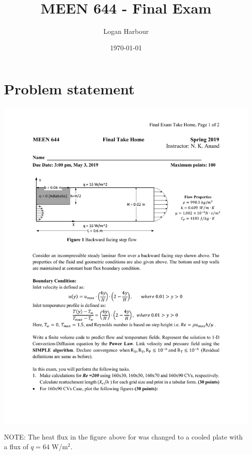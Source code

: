 \documentclass{article}
\newcommand{\pageTitle}{MEEN 644 - Final Exam}
\newcommand{\pageAuthor}{Logan Harbour}
\begin{document}
\title{\LARGE \textbf{\pageTitle} \vspace{-0.3cm}}
\author{\large \pageAuthor}
\date{\vspace{-0.6cm} \large \today \vspace{-0.4cm}}

\maketitle

\section{Problem statement}

\begin{center}
	\includegraphics[trim={2.8cm 16.8cm 2.5cm 6cm},clip,page=1,scale=0.8]{../doc/final.pdf}
\end{center}

NOTE: The heat flux in the figure above for was changed to a cooled plate with a flux of $q = 64$ W/m$^2$.
\end{document}
